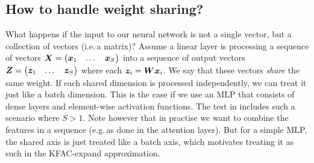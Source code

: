 \subsection{How to handle weight sharing?}
What happens if the input to our neural network is not a single vector, but a collection of vectors (i.e.\,a matrix)? Assume a linear layer is processing a sequence of vectors ${\bm{X}} =
\begin{pmatrix} {\bm{x}}_1 & \dots & {\bm{x}}_S \end{pmatrix}$ into a sequence of output vectors ${\bm{Z}} =
\begin{pmatrix} {\bm{z}}_1 & \dots & {\bm{z}}_S \end{pmatrix}$ where each ${\bm{z}}_i = {\bm{W}} {\bm{x}}_i$.
We say that these vectors \emph{share} the same weight.
If each shared dimension is processed independently, we can treat it just like a batch dimension.
This is the case if we use an MLP that consists of dense layers and element-wise activation functions.
The test in  includes such a scenario where $S > 1$.
Note however that in practise we want to combine the features in a sequence (e.g.\,as done in the attention layer).
But for a simple MLP, the shared axis is just treated like a batch axis, which motivates treating it as such in the KFAC-expand approximation.

